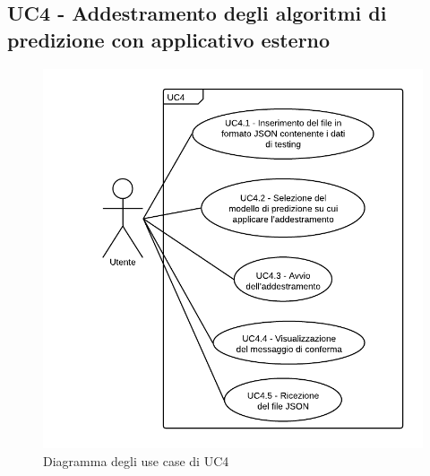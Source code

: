 \subsection{UC4 - Addestramento degli algoritmi di predizione con applicativo esterno}
\begin{figure}[H]
\includegraphics{img/UC4 - Addestramento degli algoritmi di predizione con applicativo esterno.png}
\caption{Diagramma degli use case di UC4}
\end{figure}
